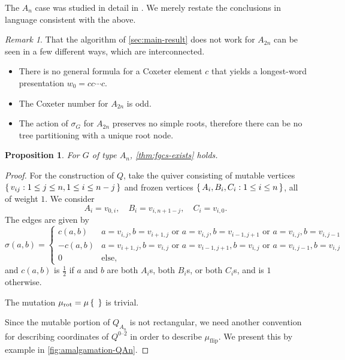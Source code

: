 \documentclass{amsart}
\theoremstyle{plain}
\newtheorem{proposition}[theorem]{Proposition}
\theoremstyle{definition}
\theoremstyle{remark}
\newtheorem{remark}[theorem]{Remark}
\newcommand{\Qdv}{Q^{0\text{--}2}}
\newcommand{\muflip}{{\mu_{\text{flip}}}}
\newcommand{\murot}{{\mu_{\text{rot}}}}
\begin{document}
  \label{sec:An-case}

  The $A_n$ case was studied in detail in \cite{gtz2015}. We merely
  restate the conclusions in language consistent with the above.

  \begin{remark}
    That the algorithm of \cref{sec:main-result} does not work for
    $A_{2n}$ can be seen in a few different ways, which are
    interconnected.
    \begin{itemize}
    \item
      There is no general formula for a Coxeter element $c$ that yields
      a longest-word presentation $w_0 = c c \dotsb c$.
    \item
      The Coxeter number for $A_{2n}$ is odd.
    \item
      The action of $\sigma_G$ for $A_{2n}$ preserves no simple roots,
      therefore there can be no tree partitioning with a unique root
      node.
    \end{itemize}
  \end{remark}

  \begin{proposition}
    \label{prop:fgcs-exists-for-An}
    For $G$ of type $A_n$, \cref{thm:fgcs-exists} holds.
  \end{proposition}
  \begin{proof}
    For the construction of $Q$, take the quiver consisting of mutable
    vertices $\set{v_{ij} : 1 \le j \le n, 1 \le i \le n - j}$ and
    frozen vertices $\set{A_i, B_i, C_i : 1 \le i \le n}$, all of weight
    $1$. We consider \[ A_{i} = v_{0,i}, \quad B_{i} = v_{i,n+1-j},
      \quad C_{i} = v_{i,0}. \] The edges are given by \[ \sigma(a,b) =
      \begin{cases} c(a,b) & a = v_{i,j}, b = v_{i+1,j} \text{ or } a =
        v_{i,j}, b = v_{i-1,j+1} \text{ or } a = v_{i,j}, b = v_{i,j-1}
        \\ -c(a,b) & a = v_{i+1,j}, b = v_{i,j} \text{ or } a =
        v_{i-1,j+1}, b = v_{i,j} \text{ or } a = v_{i,j-1}, b = v_{i,j}
        \\ 0 & \text{else}, \end{cases} \] and $c(a,b)$ is $\frac{1}{2}$
    if $a$ and $b$ are both $A_i$s, both $B_i$s, or both $C_i$s, and is
    $1$ otherwise.

    The mutation $\murot = \mu\Set{}$ is trivial.

    Since the mutable portion of $Q_{A_n}$ is not rectangular, we need
    another convention for describing coordinates of $\Qdv$ in order to
    describe $\muflip$. We present this by example in
    \cref{fig:amalgamation-QAn}.
  \end{proof}
\end{document}

